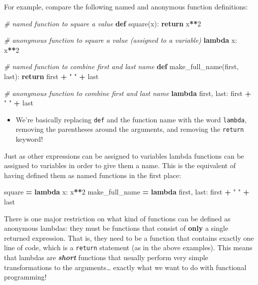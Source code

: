 \documentclass[]{book}
\newenvironment{Shaded}{\begin{snugshade}}{\end{snugshade}}
\newcommand{\KeywordTok}[1]{\textcolor[rgb]{0.13,0.29,0.53}{\textbf{#1}}}
\newcommand{\DecValTok}[1]{\textcolor[rgb]{0.00,0.00,0.81}{#1}}
\newcommand{\StringTok}[1]{\textcolor[rgb]{0.31,0.60,0.02}{#1}}
\newcommand{\CommentTok}[1]{\textcolor[rgb]{0.56,0.35,0.01}{\textit{#1}}}
\newcommand{\ControlFlowTok}[1]{\textcolor[rgb]{0.13,0.29,0.53}{\textbf{#1}}}
\newcommand{\OperatorTok}[1]{\textcolor[rgb]{0.81,0.36,0.00}{\textbf{#1}}}
\newcommand{\NormalTok}[1]{#1}
\providecommand{\tightlist}{%
  \setlength{\itemsep}{0pt}\setlength{\parskip}{0pt}}
\begin{document}
For example, compare the following named and anonymous function
definitions:

\begin{Shaded}
\begin{Highlighting}[]
\CommentTok{# named function to square a value}
\KeywordTok{def}\NormalTok{ square(x):}
    \ControlFlowTok{return}\NormalTok{ x}\OperatorTok{**}\DecValTok{2}

\CommentTok{# anonymous function to square a value (assigned to a variable)}
\KeywordTok{lambda}\NormalTok{ x: x}\OperatorTok{**}\DecValTok{2}

\CommentTok{# named function to combine first and last name}
\KeywordTok{def}\NormalTok{ make_full_name(first, last):}
    \ControlFlowTok{return}\NormalTok{ first }\OperatorTok{+} \StringTok{" "} \OperatorTok{+}\NormalTok{ last}

\CommentTok{# anonymous function to combine first and last name}
\KeywordTok{lambda}\NormalTok{ first, last: first }\OperatorTok{+} \StringTok{" "} \OperatorTok{+}\NormalTok{ last}
\end{Highlighting}
\end{Shaded}

\begin{itemize}
\tightlist
\item
  We're basically replacing \texttt{def} and the function name with the
  word \texttt{lambda}, removing the parentheses around the arguments,
  and removing the \texttt{return} keyword!
\end{itemize}

Just as other expressions can be assigned to variables lambda functions
can be assigned to variables in order to give them a name. This is the
equivalent of having defined them as named functions in the first place:

\begin{Shaded}
\begin{Highlighting}[]
\NormalTok{square }\OperatorTok{=} \KeywordTok{lambda}\NormalTok{ x: x}\OperatorTok{**}\DecValTok{2}
\NormalTok{make_full_name }\OperatorTok{=} \KeywordTok{lambda}\NormalTok{ first, last: first }\OperatorTok{+} \StringTok{" "} \OperatorTok{+}\NormalTok{ last}
\end{Highlighting}
\end{Shaded}

There is one major restriction on what kind of functions can be defined
as anonymous lambdas: they must be functions that consist of
\textbf{only} a single returned expression. That is, they need to be a
function that contains exactly one line of code, which is a
\texttt{return} statement (as in the above examples). This means that
lambdas are \textbf{\emph{short}} functions that usually perform very
simple transformations to the arguments\ldots{} exactly what we want to
do with functional programming!
\end{document}
